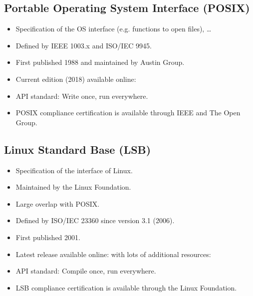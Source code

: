 		\subsection{Portable Operating System Interface (POSIX)}
			\begin{itemize}
				\item Specification of the OS interface (e.g. functions to open files), \dots
				\item Defined by IEEE 1003.x and ISO/IEC 9945.
				\item First published 1988 and maintained by Austin Group.
				\item Current edition (2018) available online: 
				\item API standard: Write once, run everywhere.
				\item POSIX compliance certification is available through IEEE and The Open Group.
			\end{itemize}

		\subsection{Linux Standard Base (LSB)}
			\begin{itemize}
				\item Specification of the interface of Linux.
				\item Maintained by the Linux Foundation.
				\item Large overlap with POSIX.
				\item Defined by ISO/IEC 23360 since version 3.1 (2006).
				\item First published 2001.
				\item Latest release available online:  with lots of additional resources: 
				\item API standard: Compile once, run everywhere.
				\item LSB compliance certification is available through the Linux Foundation.
			\end{itemize}

